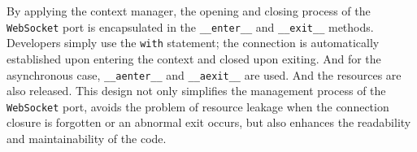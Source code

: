 \documentclass[
english,
ruledheaders=section,%
class=report,%
thesis={type=Report},%
accentcolor=9c,%
custommargins=true,%
marginpar=false,%
parskip=half-,%
fontsize=11pt,%
logofile={img/tuda_logo.pdf}, %
]{tudapub}
\begin{document}






    By applying the context manager, the opening and closing process of the \texttt{WebSocket} port is encapsulated in the \texttt{\_\_enter\_\_} and \texttt{\_\_exit\_\_} methods. Developers simply use the \texttt{with} statement; the connection is automatically established upon entering the context and closed upon exiting. And for the asynchronous case, \texttt{\_\_aenter\_\_} and \texttt{\_\_aexit\_\_} are used. And the resources are also released. This design not only simplifies the management process of the \texttt{WebSocket} port, avoids the problem of resource leakage when the connection closure is forgotten or an abnormal exit occurs, but also enhances the readability and maintainability of the code.

\end{document}
